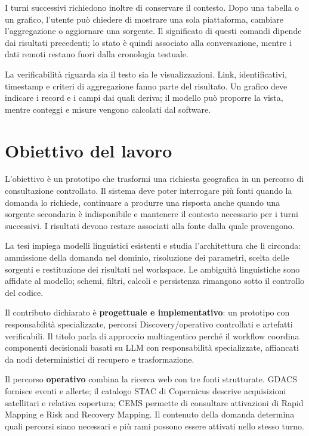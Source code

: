 I turni successivi richiedono inoltre di conservare il contesto. Dopo una tabella
o un grafico, l'utente può chiedere di mostrare una sola piattaforma, cambiare
l'aggregazione o aggiornare una sorgente. Il significato di questi comandi
dipende dai risultati precedenti; lo stato è quindi associato alla
conversazione, mentre i dati remoti restano fuori dalla cronologia testuale.

La verificabilità riguarda sia il testo sia le visualizzazioni. Link,
identificativi, timestamp e criteri di aggregazione fanno parte del risultato.
Un grafico deve indicare i record e i campi dai quali deriva; il modello può
proporre la vista, mentre conteggi e misure vengono calcolati dal software.

\section{Obiettivo del lavoro}

L'obiettivo è un prototipo che trasformi una richiesta geografica in un percorso
di consultazione controllato. Il sistema deve poter interrogare più fonti quando
la domanda lo richiede, continuare a produrre una risposta anche quando una
sorgente secondaria è indisponibile e mantenere il contesto necessario per i
turni successivi. I risultati devono restare associati alla fonte dalla quale
provengono.

La tesi impiega modelli linguistici esistenti e studia l'architettura che li
circonda: ammissione della domanda nel dominio, risoluzione dei parametri,
scelta delle sorgenti e restituzione dei risultati nel workspace. Le ambiguità
linguistiche sono affidate al modello; schemi, filtri, calcoli e persistenza
rimangono sotto il controllo del codice.

Il contributo dichiarato è \textbf{progettuale e implementativo}: un prototipo
con responsabilità specializzate, percorsi Discovery/operativo controllati e
artefatti verificabili. Il titolo parla di approccio multiagentico perché il
workflow coordina componenti decisionali basati su LLM con responsabilità
specializzate, affiancati da nodi deterministici di recupero e trasformazione.

Il percorso \textbf{operativo} combina la ricerca web con tre fonti strutturate.
GDACS fornisce eventi e allerte; il catalogo STAC di Copernicus descrive
acquisizioni satellitari e relativa copertura; CEMS permette di consultare
attivazioni di Rapid Mapping e Risk and Recovery Mapping. Il contenuto della
domanda determina quali percorsi siano necessari e più rami possono essere
attivati nello stesso turno.

